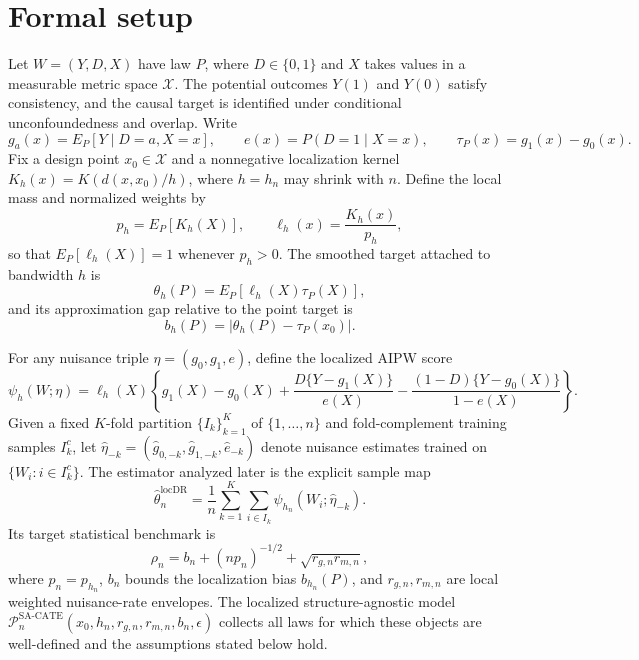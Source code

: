\documentclass[11pt]{article}
\theoremstyle{definition}
\theoremstyle{plain}
\theoremstyle{remark}
\begin{document}
\section{Formal setup}
Let $W=(Y,D,X)$ have law $P$, where $D\in\{0,1\}$ and $X$ takes values in a measurable metric space
$\mathcal{X}$. The potential outcomes $Y(1)$ and $Y(0)$ satisfy consistency, and the causal target is
identified under conditional unconfoundedness and overlap. Write
\[
  g_a(x)=E_P[Y\mid D=a,X=x], \qquad e(x)=P(D=1\mid X=x), \qquad \tau_P(x)=g_1(x)-g_0(x).
\]
Fix a design point $x_0\in\mathcal{X}$ and a nonnegative localization kernel
$K_h(x)=K(d(x,x_0)/h)$, where $h=h_n$ may shrink with $n$. Define the local mass and normalized
weights by
\[
  p_h=E_P[K_h(X)], \qquad \ell_h(x)=\frac{K_h(x)}{p_h},
\]
so that $E_P[\ell_h(X)]=1$ whenever $p_h>0$. The smoothed target attached to bandwidth $h$ is
\[
  \theta_h(P)=E_P[\ell_h(X)\tau_P(X)],
\]
and its approximation gap relative to the point target is
\[
  b_h(P)=\left|\theta_h(P)-\tau_P(x_0)\right|.
\]

For any nuisance triple $\eta=(g_0,g_1,e)$, define the localized AIPW score
\[
  \psi_h(W;\eta)=\ell_h(X)\left\{g_1(X)-g_0(X)
  +\frac{D\{Y-g_1(X)\}}{e(X)}
  -\frac{(1-D)\{Y-g_0(X)\}}{1-e(X)}\right\}.
\]
Given a fixed $K$-fold partition $\{I_k\}_{k=1}^K$ of $\{1,\dots,n\}$ and fold-complement training
samples $I_k^c$, let $\hat\eta_{-k}=(\hat g_{0,-k},\hat g_{1,-k},\hat e_{-k})$ denote nuisance
estimates trained on $\{W_i:i\in I_k^c\}$. The estimator analyzed later is the explicit sample map
\[
  \hat\theta_n^{\mathrm{locDR}}
  =\frac{1}{n}\sum_{k=1}^K\sum_{i\in I_k}\psi_{h_n}(W_i;\hat\eta_{-k}).
\]
Its target statistical benchmark is
\[
  \rho_n=b_n+(n p_n)^{-1/2}+\sqrt{r_{g,n}r_{m,n}},
\]
where $p_n=p_{h_n}$, $b_n$ bounds the localization bias $b_{h_n}(P)$, and
$r_{g,n},r_{m,n}$ are local weighted nuisance-rate envelopes. The localized structure-agnostic model
$\mathcal{P}_n^{\mathrm{SA\text{-}CATE}}(x_0,h_n,r_{g,n},r_{m,n},b_n,\epsilon)$ collects all laws
for which these objects are well-defined and the assumptions stated below hold.
\end{document}
